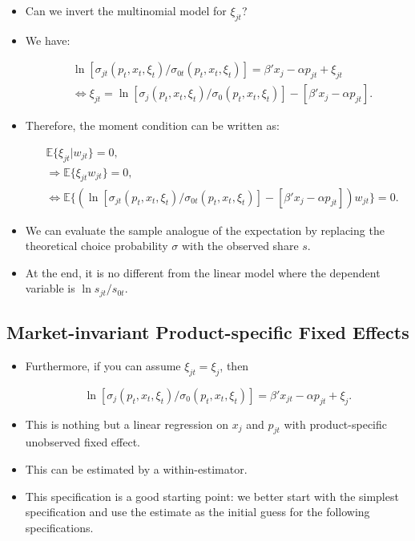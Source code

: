 \documentclass[]{book}
\providecommand{\tightlist}{%
  \setlength{\itemsep}{0pt}\setlength{\parskip}{0pt}}
\begin{document}
\begin{itemize}
\tightlist
\item
  Can we invert the multinomial model for \(\xi_{jt}\)?
\item
  We have:

  \begin{equation}
  \begin{split}
  &\ln [\sigma_{jt}(p_t, x_t, \xi_t) / \sigma_{0t}(p_t, x_t, \xi_t)] = \beta' x_j - \alpha p_{jt} + \xi_{jt}\\
  &\Leftrightarrow \xi_{jt} = \ln [\sigma_j(p_t, x_t, \xi_t) / \sigma_0(p_t, x_t, \xi_t)] - [\beta' x_j - \alpha p_{jt}].
  \end{split}
  \end{equation}
\item
  Therefore, the moment condition can be written as:

  \begin{equation}
  \begin{split}
  &\mathbb{E}\{\xi_{jt}|w_{jt}\} = 0,\\
  &\Rightarrow \mathbb{E}\{\xi_{jt} w_{jt}\} = 0,\\
  &\Leftrightarrow \mathbb{E}\{(\ln [\sigma_{jt}(p_t, x_t, \xi_t) / \sigma_{0t}(p_t, x_t, \xi_t)] - [\beta' x_j - \alpha p_{jt}]) w_{jt}  \} = 0.
  \end{split}
  \end{equation}
\item
  We can evaluate the sample analogue of the expectation by replacing
  the theoretical choice probability \(\sigma\) with the observed share
  \(s\).
\item
  At the end, it is no different from the linear model where the
  dependent variable is \(\ln s_{jt}/s_{0t}\).
\end{itemize}

\subsection{Market-invariant Product-specific Fixed
Effects}\label{market-invariant-product-specific-fixed-effects}

\begin{itemize}
\tightlist
\item
  Furthermore, if you can assume \(\xi_{jt} = \xi_j\), then

  \begin{equation}
  \ln [\sigma_j(p_t, x_t, \xi_t) / \sigma_0(p_t, x_t, \xi_t)] = \beta' x_{jt} - \alpha p_{jt} + \xi_{j}.
  \end{equation}
\item
  This is nothing but a linear regression on \(x_j\) and \(p_{jt}\) with
  product-specific unobserved fixed effect.
\item
  This can be estimated by a within-estimator.
\item
  This specification is a good starting point: we better start with the
  simplest specification and use the estimate as the initial guess for
  the following specifications.
\end{itemize}
\end{document}
